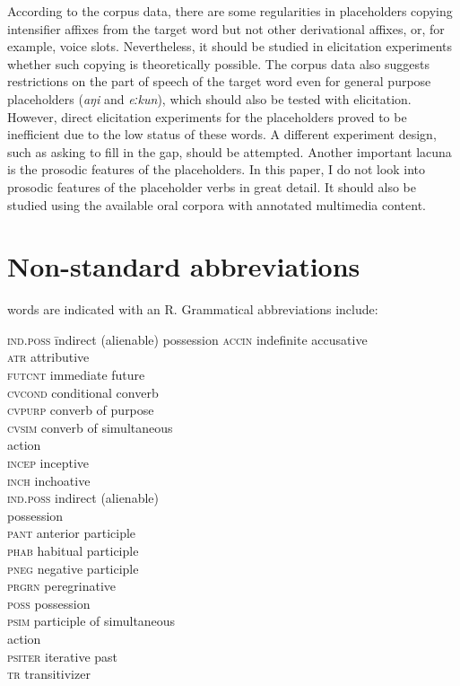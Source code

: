 \documentclass[output=paper,colorlinks,citecolor=brown]{langscibook}
\begin{document}
According to the corpus data, there are some regularities in placeholders copying intensifier affixes from the target word but not other derivational affixes, or, for example, voice slots. Nevertheless, it should be studied in elicitation experiments whether such copying is theoretically possible. The corpus data also suggests restrictions on the part of speech of the target word even for general purpose placeholders (\textit{aŋi} and \textit{eːkun}), which should also be tested with elicitation. However, direct elicitation experiments for the placeholders proved to be inefficient due to the low status of these words. A different experiment design, such as asking to fill in the gap, should be attempted. Another important lacuna is the prosodic features of the placeholders. In this paper, I do not look into prosodic features of the placeholder verbs in great detail. It should also be studied using the available oral corpora with annotated multimedia content.


\section*{Non-standard abbreviations}

 words are indicated with an R. Grammatical abbreviations include:

\begin{multicols}{2}
\begin{tabbing}
\textsc{ind.poss}\hspace{1ex} \= indirect (alienable) possession\kill
\textsc{accin} \> indefinite accusative\\
\textsc{atr} \> attributive\\
\textsc{futcnt} \> immediate future\\
\textsc{cvcond} \> conditional converb\\
\textsc{cvpurp} \> converb of purpose\\
\textsc{cvsim} \> converb of simultaneous \\ \> action\\
\textsc{incep} \> inceptive\\
\textsc{inch} \> inchoative\\
\textsc{ind.poss} \> indirect (alienable) \\ \> possession\\
\textsc{pant} \> anterior participle\\
\textsc{phab} \> habitual participle\\
\textsc{pneg} \> negative participle\\
\textsc{prgrn} \> peregrinative\\
\textsc{poss} \> possession\\
\textsc{psim} \> participle of simultaneous \\ \> action\\
\textsc{psiter} \> iterative past\\
\textsc{tr} \> transitivizer\\
\end{tabbing}
\end{multicols}
\end{document}
